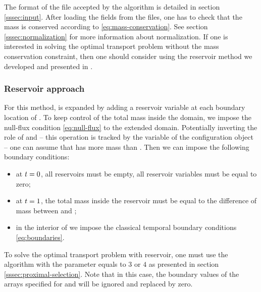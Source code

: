             

            The format of the file accepted by the algorithm is detailed in section \ref{sssec:input}.
            After loading the fields from the files, one has to check that the mass is conserved according
            to \eqref{eq:mass-conservation}. See section \ref{sssec:normalization} for more information about normalization.
            If one is interested in solving the optimal transport problem without the mass conservation constraint,
            then one should consider using the reservoir method we developed and presented in \cite{farchi-2016}.

        \subsubsection{Reservoir approach}
        \noindent

            For this method, \spaceE{} is expanded by adding a reservoir variable at each boundary location of \spaceE{}.
            To keep control of the total mass inside the domain, we impose the null-flux condition \eqref{eq:null-flux}
            to the extended domain. Potentially inverting the role of \fI{} and \fII{} -- this operation is
            tracked by the variable  of the configuration object -- one can assume that 
            \fI{} has more mass than \fII{}. Then we can impose the following boundary conditions:
            \begin{itemize}
                \item at $t=0$, all reservoirs must be empty, \ie{} all reservoir variables must be equal to zero;
                \item at $t=1$, the total mass inside the reservoir must be equal to the difference of mass between
                    \fI{} and \fII{};
                \item in the interior of \spaceE{} we impose the classical temporal boundary conditions \eqref{eq:boundaries}.
            \end{itemize}

            To solve the optimal transport problem with reservoir, one must use the \drAlgo{} algorithm with
            the parameter  equals to $3$ or $4$ as presented in section \ref{sssec:proximal-selection}.
            Note that in this case, the boundary values of the arrays specified for \fI{} and \fII{} will
            be ignored and replaced by zero.

